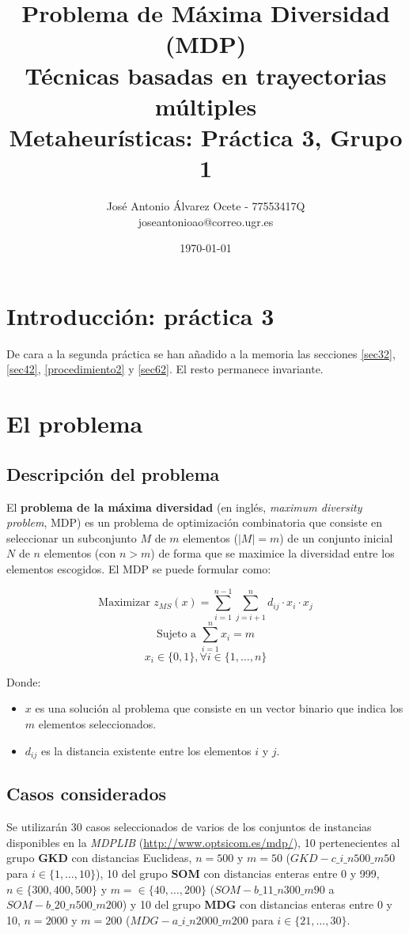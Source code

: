\documentclass[11pt,a4paper]{article}
\title{Problema de Máxima Diversidad (MDP) 
	\\\medskip \large Técnicas basadas en trayectorias múltiples \\\medskip
	\large Metaheurísticas: Práctica 3, Grupo 1}
\author{José Antonio Álvarez Ocete - 77553417Q \\ joseantonioao@correo.ugr.es}
\date{ \today }
\begin{document}
	
	
	\maketitle 
	\newpage
	\tableofcontents
	\newpage
	
	\section{Introducción: práctica 3}
	
	De cara a la segunda práctica se han añadido a la memoria las secciones \ref{sec32}, \ref{sec42}, \ref{procedimiento2} y  \ref{sec62}. El resto permanece invariante.
		
	\section{El problema}
	
	\subsection{Descripción del problema}
	
	El \textbf{problema de la máxima diversidad} (en inglés, \emph{maximum diversity problem}, MDP) es un problema de optimización combinatoria que consiste en seleccionar un
	subconjunto $M$ de $m$ elementos ($|M|=m$) de un conjunto inicial $N$ de $n$ elementos (con $n>m$) de forma que se maximice la diversidad entre los elementos escogidos. El MDP se puede formular como:
	
	$$ \text{Maximizar } z_{MS}(x) = \sum_{i=1}^{n-1} \sum_{j=i+1}^{n} d_{ij} \cdot x_i \cdot x_j $$
	$$ \text{Sujeto a } \sum_{i=1}^{n} x_i = m $$
	$$ x_i \in \{0,1\}, \forall i \in \{1,\dotsc,n\} $$
	
	Donde:
	\begin{itemize}
		\item $x$ es una solución al problema que consiste en un vector binario que indica los $m$ elementos seleccionados.
		\item $d_{ij}$ es la distancia existente entre los elementos $i$ y $j$.
		
	\end{itemize}

	\subsection{Casos considerados}
	
	Se utilizarán 30 casos seleccionados de varios de los conjuntos de instancias disponibles en la \emph{MDPLIB} (\url{http://www.optsicom.es/mdp/}), 10 pertenecientes al grupo \textbf{GKD} con distancias Euclideas, $n=500$ y $m=50$ ($GKD-c\_i\_n500\_m50$ para $i\in\{1,\dotsc,10\}$), 10 del grupo \textbf{SOM} con distancias enteras entre 0 y 999, $n\in\{300,400,500\}$ y $m=\in\{40,\dotsc,200\}$ ($SOM-b\_11\_n300\_m90$ a $SOM-b\_20\_n500\_m200$) y 10 del grupo \textbf{MDG} con distancias enteras entre 0 y 10, $n=2000$ y $m=200$ ($MDG-a\_i\_n2000\_m200$ para $i\in\{21,\dotsc,30\}$. \\
	
\end{document}
